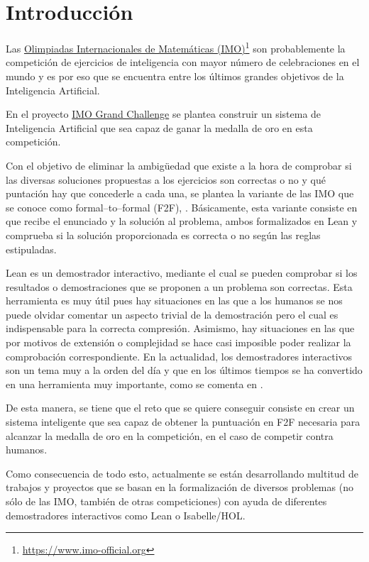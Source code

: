 \chapter*{Introducción}

Las \href{https://www.imo-official.org/}{Olimpiadas Internacionales de
  Matemáticas (IMO)}\footnote{\url{https://www.imo-official.org}} son
probablemente la competición de ejercicios de inteligencia con mayor
número de celebraciones en el mundo y es por eso que se encuentra entre
los últimos grandes objetivos de la Inteligencia Artificial.

En el proyecto
\href{https://imo-grand-challenge.github.io/}{IMO Grand Challenge}
se plantea construir un sistema de Inteligencia Artificial que sea capaz
de ganar la medalla de oro en esta competición.

Con el objetivo de eliminar la ambigüedad que existe a la hora de comprobar si
las diversas soluciones propuestas a los ejercicios son correctas o no y qué
puntación hay que concederle a cada una, se plantea la variante de las IMO
que se conoce como formal--to--formal (F2F), \cite{challenge}. Básicamente, esta
variante consiste en que recibe el enunciado y la solución al problema, ambos
formalizados en Lean y comprueba si la solución proporcionada es correcta o no
según las reglas estipuladas.

Lean es un demostrador interactivo, mediante el cual se pueden comprobar
si los resultados o demostraciones que se proponen a un problema son
correctas. Esta herramienta es muy útil pues hay situaciones en las que
a los humanos se nos puede olvidar comentar un aspecto trivial de la
demostración pero el cual es indispensable para la correcta
compresión. Asimismo, hay situaciones en las que por motivos de
extensión o complejidad se hace casi imposible poder realizar la
comprobación correspondiente. En la actualidad, los demostradores
interactivos son un tema muy a la orden del día y que en los últimos
tiempos se ha convertido en una herramienta muy importante, como se
comenta en \cite{ART2}.

De esta manera, se tiene que el reto que se quiere conseguir consiste en
crear un sistema inteligente que sea capaz de obtener la puntuación en
F2F necesaria para alcanzar la medalla de oro en la competición, en el
caso de competir contra humanos.

Como consecuencia de todo esto, actualmente se están desarrollando
multitud de trabajos y proyectos que se basan en la formalización de
diversos problemas (no sólo de las IMO, también de otras competiciones)
con ayuda de diferentes demostradores interactivos como Lean o
Isabelle/HOL.

